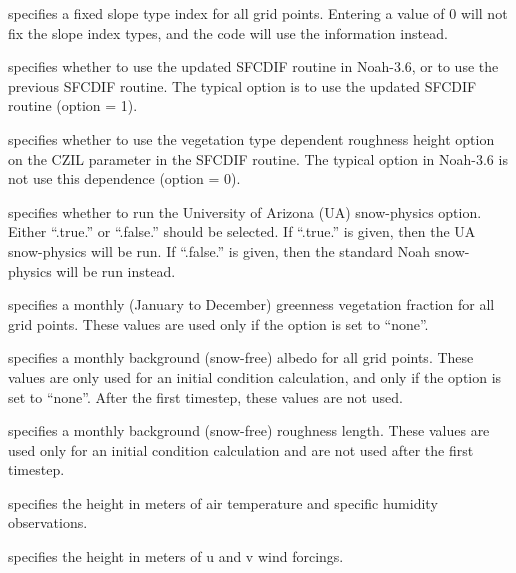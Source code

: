   specifies a fixed slope
 type index for all grid points.  Entering a value of 0 will
 not fix the slope index types, and the code will use the
  information instead.

  specifies whether to use the updated
 SFCDIF routine in Noah-3.6, or to use the previous SFCDIF routine.
 The typical option is to use the updated SFCDIF routine (option = 1).

  specifies whether
 to use the vegetation type dependent roughness height option
 on the CZIL parameter in the SFCDIF routine.  The typical option
 in Noah-3.6 is not use this dependence (option = 0).

  specifies whether
 to run the University of Arizona (UA) snow-physics option.
 Either ``.true.'' or ``.false.'' should be selected.  If
 ``.true.'' is given, then the UA snow-physics will be run.
 If ``.false.'' is given, then the standard Noah snow-physics
 will be run instead.

  specifies a monthly (January
 to December) greenness vegetation fraction for all grid points.
 These values are used only if the 
 option is set to ``none''.

  specifies a monthly background
 (snow-free) albedo for all grid points.  These values are only
 used for an initial condition calculation, and only if the
  option is set to ``none''.  After
 the first timestep, these values are not used.

  specifies a monthly
 background (snow-free) roughness length.  These values are used
 only for an initial condition calculation and are not used after
 the first timestep.

  specifies the
 height in meters of air temperature and specific humidity observations.

  specifies the
 height in meters of u and v wind forcings.
 

